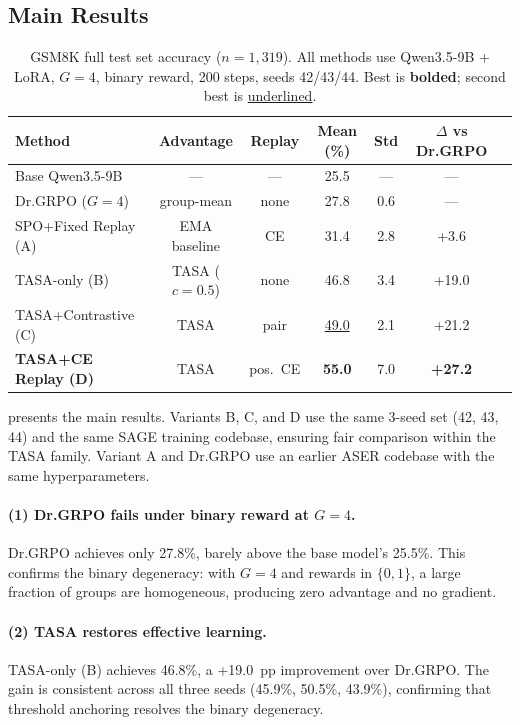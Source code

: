 \subsection{Main Results}

\begin{table}[t]
\centering
\caption{GSM8K full test set accuracy ($n{=}1{,}319$). All methods use Qwen3.5-9B + LoRA, $G{=}4$, binary reward, 200 steps, seeds 42/43/44. Best is \textbf{bolded}; second best is \underline{underlined}.}
\label{tab:main}
\small
\begin{tabular}{lcccccc}
\toprule
\textbf{Method} & \textbf{Advantage} & \textbf{Replay} & \textbf{Mean (\%)} & \textbf{Std} & \textbf{$\Delta$ vs Dr.GRPO} \\
\midrule
Base Qwen3.5-9B & --- & --- & 25.5 & --- & --- \\
Dr.GRPO ($G{=}4$) & group-mean & none & 27.8 & 0.6 & --- \\
\midrule
SPO+Fixed Replay (A) & EMA baseline & CE & 31.4 & 2.8 & +3.6 \\
TASA-only (B) & TASA ($c{=}0.5$) & none & 46.8 & 3.4 & +19.0 \\
TASA+Contrastive (C) & TASA & pair & \underline{49.0} & 2.1 & +21.2 \\
\textbf{TASA+CE Replay (D)} & TASA & pos.\ CE & \textbf{55.0} & 7.0 & \textbf{+27.2} \\
\bottomrule
\end{tabular}
\end{table}

 presents the main results.
Variants B, C, and D use the same 3-seed set (42, 43, 44) and the same SAGE training codebase, ensuring fair comparison within the TASA family.
Variant A and Dr.GRPO use an earlier ASER codebase with the same hyperparameters.

\paragraph{(1) Dr.GRPO fails under binary reward at $G{=}4$.}
Dr.GRPO achieves only 27.8\%, barely above the base model's 25.5\%.
This confirms the binary degeneracy: with $G{=}4$ and rewards in $\{0,1\}$, a large fraction of groups are homogeneous, producing zero advantage and no gradient.

\paragraph{(2) TASA restores effective learning.}
TASA-only (B) achieves 46.8\%, a +19.0~pp improvement over Dr.GRPO.
The gain is consistent across all three seeds (45.9\%, 50.5\%, 43.9\%), confirming that threshold anchoring resolves the binary degeneracy.

